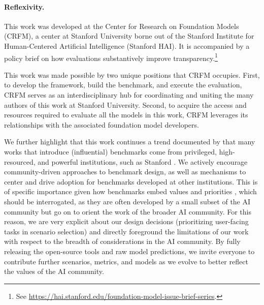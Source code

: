 \paragraph{Reflexivity.}
This work was developed at the Center for Research on Foundation Models (CRFM), a center at Stanford University borne out of the Stanford Institute for Human-Centered Artificial Intelligence (Stanford HAI).
It is accompanied by a policy brief on how evaluations substantively improve transparency.\footnote{See \url{https://hai.stanford.edu/foundation-model-issue-brief-series}.}

This work was made possible by two unique positions that CRFM occupies.
First, to develop the framework, build the benchmark, and execute the evaluation, CRFM serves as an interdisciplinary hub for coordinating and uniting the many authors of this work at Stanford University.
Second, to acquire the access and resources required to evaluate all the models in this work, CRFM leverages its relationships with the associated foundation model developers.

We further highlight that this work continues a trend documented by \citet{koch2021reduced} that many works that introduce (influential) benchmarks come from privileged, high-resourced, and powerful institutions, such as Stanford \citep[\eg][]{socher2013recursive, bowman2015large, rajpurkar2016squad, srivastava2021behavior}.
We actively encourage community-driven approaches to benchmark design, as well as mechanisms to center and drive adoption for benchmarks developed at other institutions.
This is of specific importance given how benchmarks embed values and priorities \citep{ethayarajh2020utility, birhane2022values}, which should be interrogated, as they are often developed by a small subset of the AI community but go on to orient the work of the broader AI community.
For this reason, we are very explicit about our design decisions (\eg prioritizing user-facing tasks in scenario selection) and directly foreground the limitations of our work with respect to the breadth of considerations in the AI community.
By fully releasing the open-source tools and raw model predictions, we invite everyone to contribute further scenarios, metrics, and models as we evolve \benchmarkname to better reflect the values of the AI community.
